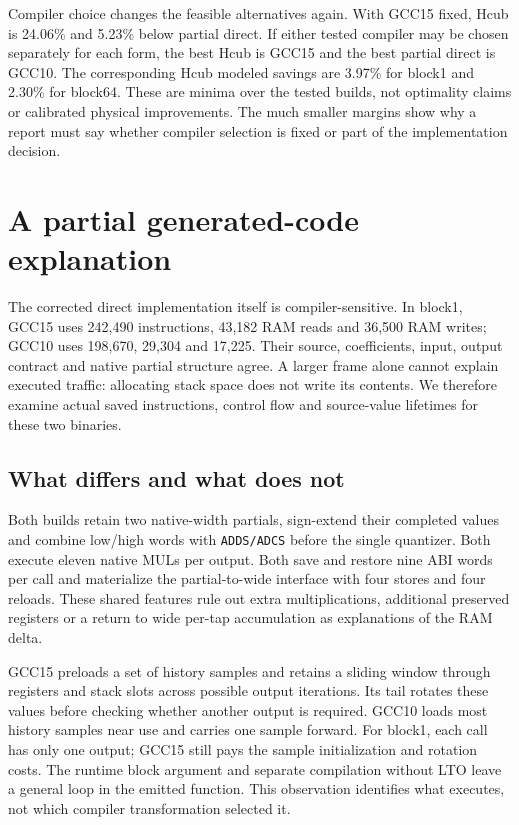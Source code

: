 \documentclass[conference]{IEEEtran}
\begin{document}
Compiler choice changes the feasible alternatives again. With GCC15
fixed, Hcub is 24.06\% and 5.23\% below partial direct. If either tested
compiler may be chosen separately for each form, the best Hcub is GCC15
and the best partial direct is GCC10. The corresponding Hcub modeled
savings are 3.97\% for block1 and 2.30\% for block64. These are minima
over the tested builds, not optimality claims or calibrated physical
improvements. The much smaller margins show why a report must say
whether compiler selection is fixed or part of the implementation
decision.

\section{A partial generated-code explanation}\label{a-partial-generated-code-explanation}

The corrected direct implementation itself is compiler-sensitive. In
block1, GCC15 uses 242,490 instructions, 43,182 RAM reads and 36,500 RAM
writes; GCC10 uses 198,670, 29,304 and 17,225. Their source,
coefficients, input, output contract and native partial structure agree.
A larger frame alone cannot explain executed traffic: allocating stack
space does not write its contents. We therefore examine actual saved
instructions, control flow and source-value lifetimes for these two
binaries.

\subsection{What differs and what does not}\label{what-differs-and-what-does-not}

Both builds retain two native-width partials, sign-extend their
completed values and combine low/high words with \texttt{ADDS/ADCS}
before the single quantizer. Both execute eleven native MULs per output.
Both save and restore nine ABI words per call and materialize the
partial-to-wide interface with four stores and four reloads. These
shared features rule out extra multiplications, additional preserved
registers or a return to wide per-tap accumulation as explanations of
the RAM delta.

GCC15 preloads a set of history samples and retains a sliding window
through registers and stack slots across possible output iterations. Its
tail rotates these values before checking whether another output is
required. GCC10 loads most history samples near use and carries one
sample forward. For block1, each call has only one output; GCC15 still
pays the sample initialization and rotation costs. The runtime block
argument and separate compilation without LTO leave a general loop in
the emitted function. This observation identifies what executes, not
which compiler transformation selected it.
\end{document}
